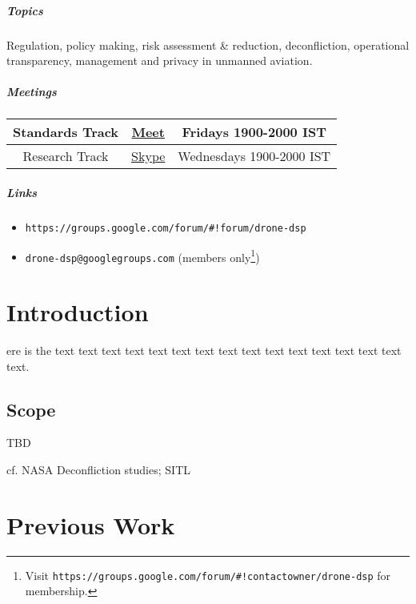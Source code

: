 \documentclass{ua_wgs_base}
\begin{document}
\paragraph*{Topics}

Regulation, policy making, risk assessment \& reduction, deconfliction,
operational transparency, management and privacy in unmanned aviation.

\paragraph*{Meetings}
\begin{center}
\begin{tabular}{|c|c|c|}
\hline 
\textsf{Standards Track} & \textsf{\href{https://meet.google.com/urz-pekp-rwr}{Meet}} & \textsf{Fridays 1900-2000 IST}\tabularnewline
\hline 
\textsf{Research Track} & \textsf{\href{https://join.skype.com/RkNeUB8wNvzx}{Skype}} & \textsf{Wednesdays 1900-2000 IST}\tabularnewline
\hline 
\end{tabular}
\par\end{center}

\paragraph*{Links}
\begin{itemize}
\item \texttt{https://groups.google.com/forum/\#!forum/drone-dsp}
\item \texttt{drone-dsp@googlegroups.com} (members only\footnote{Visit \texttt{https://groups.google.com/forum/\#!contactowner/drone-dsp}
for membership.})
\end{itemize}

\chapter{Introduction}

ere is the text text text text text text text text text text text
text text text text text.

\section{Scope}

TBD

cf. NASA Deconfliction studies; SITL

\chapter{Previous Work}
\end{document}
